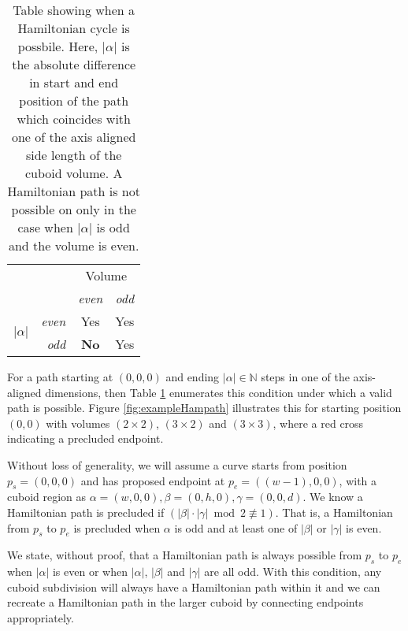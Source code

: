 \begin{table}[h]
  \centering
  \begin{tabular}[t]{cr|cc}
    \multicolumn{2}{c}{ \multirow{2}{*}{Path Possible} } & \multicolumn{2}{c}{Volume} \\
    & & \textit{even} & \textit{odd} \\
    \hline
      \multirow{2}{*}{ $|\alpha|$ } & \textit{even} & Yes & Yes \\
       & \textit{odd} & \textbf{No} & Yes \\
     \hline
  \end{tabular}
  \caption{ Table showing when a Hamiltonian cycle is possbile. Here, $|\alpha|$ is the absolute difference in start and end position of the path which
            coincides with one of the axis aligned side length of the cuboid volume. A Hamiltonian path is not possible on only in the case
            when $|\alpha|$ is odd and the volume is even. }
  \label{table:pathTable}
\end{table}


For a path starting at $(0,0,0)$ and ending $|\alpha| \in \mathbb{N}$ steps in one of the axis-aligned dimensions,
then Table \ref{table:pathTable} enumerates this condition under which a valid path is possible.
Figure \ref{fig:exampleHampath} illustrates this for starting position $(0,0)$ with volumes $(2 \times 2)$, $(3 \times 2)$ and $(3 \times 3)$,
where a red cross indicating a precluded endpoint.

Without loss of generality, we will assume a curve starts from position $p_s=(0,0,0)$ and has proposed
endpoint at $p_e=((w-1),0,0)$, with a cuboid region as $\alpha = (w,0,0), \beta = (0,h,0), \gamma = (0,0,d)$.
We know a Hamiltonian path is precluded if $(|\beta| \cdot |\gamma| \bmod{2} \not\equiv 1)$.
That is, a Hamiltonian from $p_s$ to $p_e$ is precluded when $\alpha$ is odd and at least one of $|\beta|$ or $|\gamma|$ is even.

We state, without proof, that
a Hamiltonian path is always possible from $p_s$ to $p_e$ when $|\alpha|$ is even or when $|\alpha|$, $|\beta|$ and $|\gamma|$
are all odd.
With this condition, any cuboid subdivision will always have a Hamiltonian path within it and we can recreate a Hamiltonian
path in the larger cuboid by connecting endpoints appropriately.





